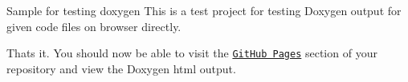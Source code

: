 Sample for testing doxygen This is a test project for testing Doxygen output for given code files on browser directly.

Thats it. You should now be able to visit the \href{http://sachitjani81.github.io/sample/}{\tt Git\+Hub Pages} section of your repository and view the Doxygen html output.